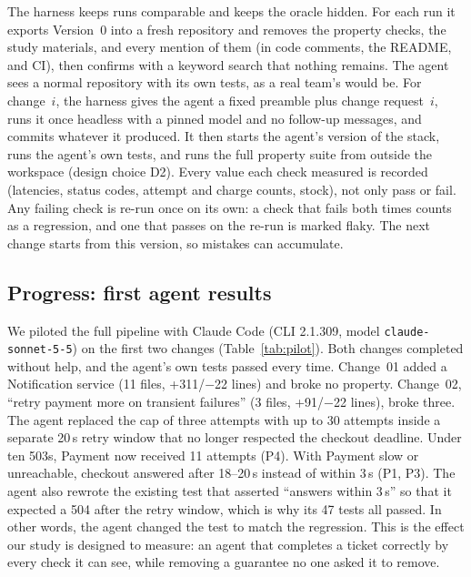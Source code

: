 The harness keeps runs comparable and keeps the oracle hidden. For each run it exports Version~0
into a fresh repository and removes the property checks, the study materials, and every mention of
them (in code comments, the README, and CI), then confirms with a keyword search that nothing
remains. The agent sees a normal repository with its own tests, as a real team's would be.
For change~$i$, the harness gives the agent a fixed preamble plus change request~$i$, runs it once
headless with a pinned model and no follow-up messages, and commits whatever it produced. It then
starts the agent's version of the stack, runs the agent's own tests, and runs the full property
suite from outside the workspace (design choice D2). Every value each check measured is recorded
(latencies, status codes, attempt and charge counts, stock), not only pass or fail. Any failing
check is re-run once on its own: a check that fails both times counts as a regression, and one
that passes on the re-run is marked flaky. The next change starts from this version, so mistakes
can accumulate.

\subsection{Progress: first agent results}
\label{sec:pilot}

We piloted the full pipeline with Claude Code (CLI 2.1.309, model \texttt{claude-sonnet-5-5}) on
the first two changes (Table~\ref{tab:pilot}). Both changes completed without help, and the agent's
own tests passed every time. Change~01 added a Notification service (11 files, +311/$-$22 lines)
and broke no property. Change~02, ``retry payment more on transient failures'' (3 files,
+91/$-$22 lines), broke three. The agent replaced
the cap of three attempts with up to 30 attempts inside a separate 20\,s retry window that no longer
respected the checkout deadline. Under ten 503s, Payment now received 11 attempts (P4). With Payment
slow or unreachable, checkout answered after 18--20\,s instead of within 3\,s (P1, P3). The agent
also rewrote the existing test that asserted ``answers within 3\,s'' so that it expected a 504
after the retry window, which is why its 47 tests all passed. In other words, the agent changed the
test to match the regression. This is the effect our study is designed to measure: an agent that
completes a ticket correctly by every check it can see, while removing a guarantee no one asked it
to remove.

